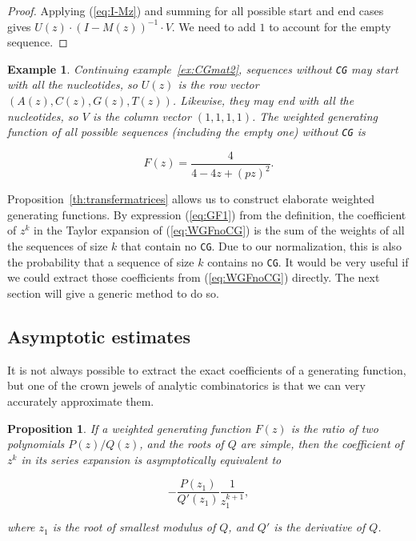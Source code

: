 \documentclass{article}
\newtheorem{example}{Example}
\newtheorem{proposition}{Proposition}
\begin{document}
\begin{proof}
Applying (\ref{eq:I-Mz}) and summing for all possible start and end cases
gives $U(z) \cdot (I-M(z))^{-1} \cdot V$. We need to add $1$ to account
for the empty sequence.
\end{proof}

\begin{example}
Continuing example~\ref{ex:CGmat2}, sequences without \texttt{CG} may
start with all the nucleotides, so $U(z)$ is the row vector $(A(z), C(z),
G(z), T(z))$. Likewise, they may end with all the nucleotides, so $V$ is
the column vector $(1,1,1,1)$. The weighted generating function of all
possible sequences (including the empty one) without \texttt{CG} is

\begin{equation}
\label{eq:WGFnoCG}
F(z) = \frac{4}{4-4z+(pz)^2}.
\end{equation}
\end{example}

Proposition~\ref{th:transfermatrices} allows us to construct
elaborate weighted generating functions. By expression (\ref{eq:GF1}) from
the definition, the coefficient of $z^k$ in the Taylor expansion of
(\ref{eq:WGFnoCG}) is the sum of the weights of all the sequences of size
$k$ that contain no \texttt{CG}. Due to our normalization, this is also
the probability that a sequence of size $k$ contains no \texttt{CG}.
It would be very useful if we could extract those coefficients from
(\ref{eq:WGFnoCG}) directly. The next section will give a generic method
to do so.




\subsection{Asymptotic estimates}

It is not always possible to extract the exact coefficients of a
generating function, but one of the crown jewels of analytic combinatorics
is that we can very accurately approximate them.

\begin{proposition}
\label{th:ass}
If a weighted generating function $F(z)$ is the ratio of two polynomials
$P(z)/Q(z)$, and the roots of $Q$ are simple, then the coefficient of
$z^k$ in its series expansion is asymptotically equivalent to

\begin{equation}
\label{eq:ass}
-\frac{P(z_1)}{Q'(z_1)}\frac{1}{z_1^{k+1}},
\end{equation}

\noindent
where $z_1$ is the root of smallest modulus of $Q$,
and $Q'$ is the derivative of $Q$.
\end{proposition}
\end{document}
